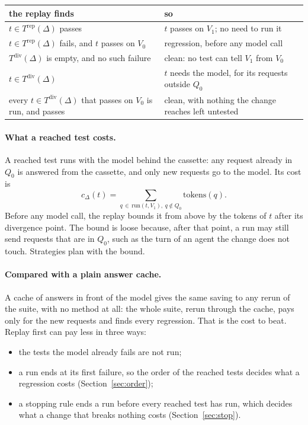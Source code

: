 \documentclass[11pt,a4paper]{article}
\newcommand{\Trep}{T^{\mathrm{rep}}(\Delta)}
\newcommand{\Tdiv}{T^{\mathrm{div}}(\Delta)}
\begin{document}
\begin{center}
\begin{tabular}{@{}L{7.4cm}L{8.6cm}@{}}
\toprule
the replay finds & so \\
\midrule
$t \in \Trep$ passes & $t$ passes on $V_1$; no need to run it \\
\addlinespace
$t \in \Trep$ fails, and $t$ passes on $V_0$ & regression, before any model call \\
\addlinespace
$\Tdiv$ is empty, and no such failure & clean: no test can tell $V_1$ from $V_0$ \\
\addlinespace
$t \in \Tdiv$ & $t$ needs the model, for its requests outside $Q_0$ \\
\addlinespace
every $t \in \Tdiv$ that passes on $V_0$ is run, and passes & clean, with nothing the change reaches left
  untested \\
\bottomrule
\end{tabular}
\end{center}

\paragraph{What a reached test costs.} A reached test runs with the model behind the cassette: any request already
in $Q_0$ is answered from the cassette, and only new requests go to the model. Its cost is
\[
  c_\Delta(t) = \sum_{q \,\in\, \mathrm{run}(t, V_1),\ q \notin Q_0} \mathrm{tokens}(q).
\]
Before any model call, the replay bounds it from above by the tokens of $t$ after its divergence point. The bound
is loose because, after that point, a run may still send requests that are in $Q_0$, such as the turn of an agent
the change does not touch. Strategies plan with the bound.

\paragraph{Compared with a plain answer cache.} A cache of answers in front of the model gives the same saving to
any rerun of the suite, with no method at all: the whole suite, rerun through the cache, pays only for the new
requests and finds every regression. That is the cost to beat. Replay first can pay less in three ways:
\begin{itemize}
  \item the tests the model already fails are not run;
  \item a run ends at its first failure, so the order of the reached tests decides what a regression costs
        (Section~\ref{sec:order});
  \item a stopping rule ends a run before every reached test has run, which decides what a change that breaks
        nothing costs (Section~\ref{sec:stop}).
\end{itemize}
\end{document}

